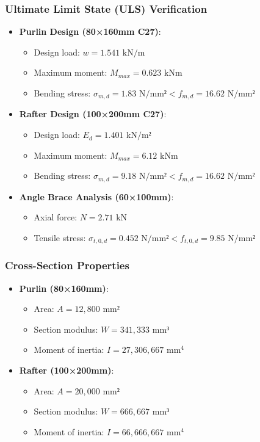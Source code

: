 \documentclass[12pt,a4paper]{article}
\begin{document}
\subsubsection{Ultimate Limit State (ULS) Verification}
\begin{itemize}
    \item \textbf{Purlin Design (80×160mm C27)}:
        \begin{itemize}
            \item Design load: $w = 1.541 \text{ kN/m}$
            \item Maximum moment: $M_{max} = 0.623 \text{ kNm}$
            \item Bending stress: $\sigma_{m,d} = 1.83 \text{ N/mm²} < f_{m,d} = 16.62 \text{ N/mm²}$ \checkmark
        \end{itemize}
    \item \textbf{Rafter Design (100×200mm C27)}:
        \begin{itemize}
            \item Design load: $E_d = 1.401 \text{ kN/m²}$
            \item Maximum moment: $M_{max} = 6.12 \text{ kNm}$
            \item Bending stress: $\sigma_{m,d} = 9.18 \text{ N/mm²} < f_{m,d} = 16.62 \text{ N/mm²}$ \checkmark
        \end{itemize}
    \item \textbf{Angle Brace Analysis (60×100mm)}:
        \begin{itemize}
            \item Axial force: $N = 2.71 \text{ kN}$
            \item Tensile stress: $\sigma_{t,0,d} = 0.452 \text{ N/mm²} < f_{t,0,d} = 9.85 \text{ N/mm²}$ \checkmark
        \end{itemize}
\end{itemize}

\subsubsection{Cross-Section Properties}
\begin{itemize}
    \item \textbf{Purlin (80×160mm)}:
        \begin{itemize}
            \item Area: $A = 12,800 \text{ mm²}$
            \item Section modulus: $W = 341,333 \text{ mm³}$
            \item Moment of inertia: $I = 27,306,667 \text{ mm}^4$
        \end{itemize}
    \item \textbf{Rafter (100×200mm)}:
        \begin{itemize}
            \item Area: $A = 20,000 \text{ mm²}$
            \item Section modulus: $W = 666,667 \text{ mm³}$
            \item Moment of inertia: $I = 66,666,667 \text{ mm}^4$
        \end{itemize}
\end{itemize}
\end{document}
